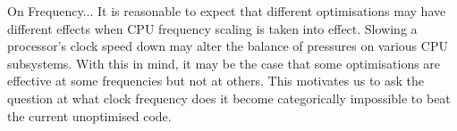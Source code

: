 

On Frequency...
It is reasonable to expect that different optimisations may have different effects when CPU frequency scaling is taken into effect. Slowing a processor's clock speed down may alter the balance of pressures on various CPU subsystems. With this in mind, it may be the case that some optimisations are effective at some frequencies but not at others. This motivates us to ask the question at what clock frequency does it become categorically impossible to beat the current unoptimised code.
